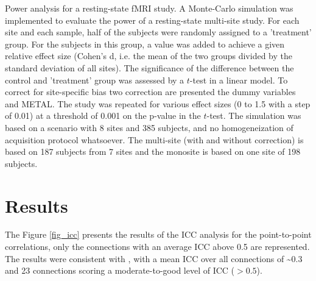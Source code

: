 \documentclass[authoryear]{elsarticle}
\begin{document}
Power analysis for a resting-state fMRI study. A Monte-Carlo simulation was implemented to evaluate the power of a resting-state multi-site study. For each site and each sample, half of the subjects were randomly assigned to a 'treatment' group. For the subjects in this group, a value was added to achieve a given relative effect size (Cohen's d, i.e. the mean of the two groups divided by the standard deviation of all sites). The significance of the difference between the control and 'treatment' group was assessed by a $t$-test in a linear model. To correct for site-specific bias two correction are presented the dummy variables and METAL. The study was repeated for various effect sizes (0 to 1.5 with a step of 0.01) at a threshold of 0.001 on the p-value in the $t$-test. The simulation was based on a scenario with 8 sites and 385 subjects, and no homogeneization of acquisition protocol whatsoever. The multi-site (with and without correction) is based on 187 subjects from 7 sites and the monosite is based on 
one site of 198 subjects.  

\section{Results}

The Figure \ref{fig_icc} presents the results of the ICC analysis for the point-to-point correlations, 
only the connections with an average ICC above 0.5 are represented. The results were consistent with \citep{Shehzad2009}, with a mean ICC over all connections of \textasciitilde0.3 and 23 connections scoring a moderate-to-good level of ICC ($>0.5$). 

\end{document}
